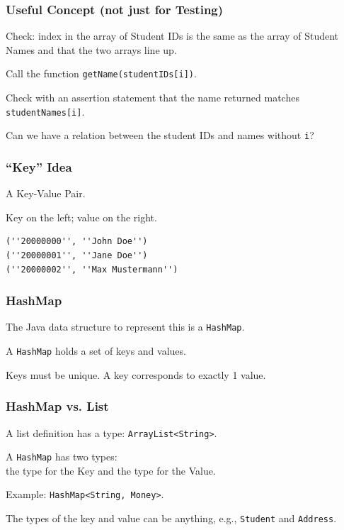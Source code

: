 \begin{frame}
\frametitle{Useful Concept (not just for Testing)}
\begin{changemargin}{1.5cm}

Check: index in the array of Student IDs is the same as the array of Student Names and that the two arrays line up. 

Call the function \texttt{getName(studentIDs[i])}.

Check with an assertion statement that the name returned matches \texttt{studentNames[i]}. 

Can we have a relation between the student IDs and names without \texttt{i}?


\end{changemargin}
\end{frame}

\begin{frame}[fragile]
\frametitle{``Key'' Idea}
\begin{changemargin}{1.5cm}

A \alert{Key-Value Pair}. 

Key on the left; value on the right.


\begin{verbatim}
(''20000000'', ''John Doe'')
(''20000001'', ''Jane Doe'')
(''20000002'', ''Max Mustermann'')
\end{verbatim}

\end{changemargin}
\end{frame}


\begin{frame}
\frametitle{HashMap}
\begin{changemargin}{1.5cm}

The Java data structure to represent this is a \texttt{HashMap}.

A \texttt{HashMap} holds a set of keys and values.

Keys must be unique. A key corresponds to exactly 1 value.


\end{changemargin}
\end{frame}


\begin{frame}
\frametitle{HashMap vs. List}
\begin{changemargin}{1.5cm}

A list definition has a type: \texttt{ArrayList<String>}. 

A \texttt{HashMap} has two types:\\
\quad the type for the Key and the type for the Value. 

Example: \texttt{HashMap<String, Money>}. 

The types of the key and value can be anything, e.g., \texttt{Student} and \texttt{Address}.



\end{changemargin}
\end{frame}


